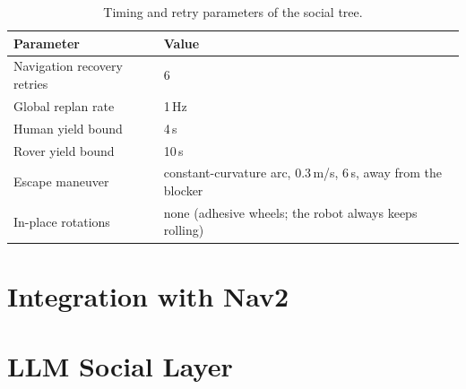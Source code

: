 
\begin{table}[htbp]
  \centering
  \small
  \caption{Timing and retry parameters of the social tree.}
  \label{tab:bt_timing}
  \begin{tabular}{ll}
    \toprule
    Parameter & Value \\
    \midrule
    Navigation recovery retries & 6 \\
    Global replan rate & 1\,Hz \\
    Human yield bound & 4\,s \\
    Rover yield bound & 10\,s \\
    Escape maneuver & constant-curvature arc, 0.3\,m/s, 6\,s, away from the blocker \\
    In-place rotations & none (adhesive wheels; the robot always keeps rolling) \\
    \bottomrule
  \end{tabular}
\end{table}


\section{Integration with Nav2}
\label{sec:sd_nav2_integration}


\section{LLM Social Layer}
\label{sec:sd_llm}

